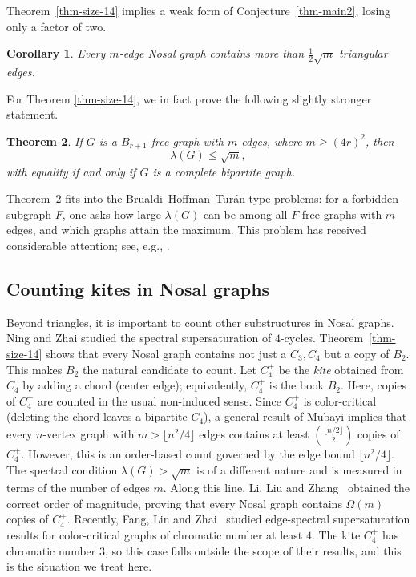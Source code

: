 \documentclass[11pt,a4paper]{article}
\newtheorem{theorem}{Theorem}[section]
\newtheorem{corollary}[theorem]{Corollary}
\theoremstyle{definition}
\theoremstyle{plain}
\renewcommand{\le}{\leqslant}
\renewcommand{\ge}{\geqslant}
\begin{document}
\medskip 
Theorem~\ref{thm-size-14} implies a weak form of
Conjecture~\ref{thm-main2}, losing only a factor of two. 

\begin{corollary}
Every $m$-edge Nosal graph contains more than $\tfrac{1}{2}\sqrt{m}$
triangular edges. 
\end{corollary}


For Theorem \ref{thm-size-14}, 
we in fact prove the following slightly stronger statement. 

\begin{theorem} \label{thm:book-free}
If $G$ is a $B_{r+1}$-free graph with $m$ edges, where $m\ge (4r)^2$, then
$$ \lambda(G)\le\sqrt{m}, $$
with equality if and only if $G$ is a complete bipartite
graph.
\end{theorem}


 Theorem~\ref{thm:book-free} fits into the Brualdi--Hoffman--Tur\'{a}n type
problems: for a forbidden subgraph $F$, one asks how large $\lambda(G)$
can be among all $F$-free graphs with $m$ edges, and which graphs attain the
maximum. 
This problem has received considerable
attention; see, e.g.,  
\cite{ZLS2021, LZS2024, LZZ2025jgt, LLLY2026aam, LLZ-edge-spectral}.  


\subsection{Counting kites in Nosal graphs}

Beyond triangles, it is important to count other  substructures in Nosal graphs. 
 Ning and Zhai \cite{NZ2021b} studied the spectral supersaturation of $4$-cycles. 
Theorem~\ref{thm-size-14} shows that every Nosal graph contains not just a $C_3, C_4$ but a
copy of $B_2$. This makes $B_2$
the natural candidate to count. Let $C_4^+$ be the \emph{kite} obtained from $C_4$ by adding a chord (center edge); equivalently, $C_4^+$ is the book $B_2$. 
Here, copies of \(C_4^+\) are counted in the
usual non-induced sense. 
Since $C_4^+$ is color-critical (deleting the chord leaves a bipartite
$C_4$), a general result of Mubayi \cite{Mubayi2010} implies that 
every $n$-vertex graph with $m> \lfloor n^2/4\rfloor$ edges contains at least ${\lfloor n/2 \rfloor \choose 2}$ copies of $C_4^+$. However, 
this is an order-based count governed by the edge bound $\lfloor n^2/4\rfloor$.
The spectral condition $\lambda(G)>\sqrt{m}$ is of a different nature and is measured in terms of the number of edges $m$.   
Along this line, Li, Liu and Zhang~\cite{LiLiuZhang26} obtained the correct order of magnitude, proving that every Nosal graph contains $\Omega(m)$ copies of $C_4^+$. 
Recently, Fang, Lin and Zhai~\cite{FangLinZhai} studied edge-spectral
supersaturation results for color-critical graphs of chromatic number at least
$4$. The kite $C_4^+$ has chromatic number $3$, so this case falls outside the scope of their results, and this is the situation we treat here.
\end{document}
